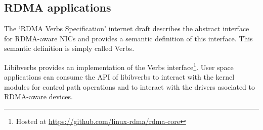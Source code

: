






\subsection{RDMA applications}

The `RDMA Verbs Specification' internet draft describes the abstract
interface for RDMA-aware NICs and provides a semantic definition of this
interface. This semantic definition is simply called Verbs\cite{hillandRDMAProtocolVerbs}.

Libibverbs provides an implementation of the Verbs interface\footnote{Hosted at \url{https://github.com/linux-rdma/rdma-core}}. User space
applications can consume the API of libibverbs to interact with
the kernel modules for control path operations and to interact with the drivers asociated
to RDMA-aware devices.


